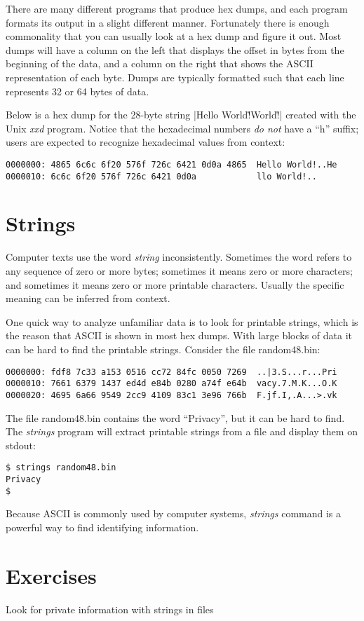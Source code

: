 There are many different programs that produce hex dumps, and each
program formats its output in a slight different manner. Fortunately
there is enough commonality that you can usually look at a hex dump
and figure it out. Most dumps will have a column on the left that
displays the offset in bytes from the beginning of the data, and a
column on the right that shows the ASCII representation of each
byte. Dumps are typically formatted such that each line represents 32
or 64 bytes of data.

Below is a hex dump for the 28-byte string 
|Hello World!\r\nHello World!\r\n| created with the Unix \emph{xxd}
program. Notice that the hexadecimal numbers \emph{do not} have a
``h'' suffix; users are expected to recognize hexadecimal values from
context:

\begin{Verbatim}
0000000: 4865 6c6c 6f20 576f 726c 6421 0d0a 4865  Hello World!..He
0000010: 6c6c 6f20 576f 726c 6421 0d0a            llo World!..
\end{Verbatim}


\section{Strings}\label{sec:strings}

Computer texts use the word \emph{string} inconsistently. Sometimes
the word refers to any sequence of zero or more bytes; sometimes it
means zero or more characters; and sometimes it means zero or
more printable characters. Usually the specific meaning can be
inferred from context. 

One quick way to analyze unfamiliar data is to look for printable
strings, which is the reason that ASCII is shown in most hex
dumps. With large blocks of data it can be hard to find the printable
strings. Consider the file random48.bin:

\begin{Verbatim}
0000000: fdf8 7c33 a153 0516 cc72 84fc 0050 7269  ..|3.S...r...Pri
0000010: 7661 6379 1437 ed4d e84b 0280 a74f e64b  vacy.7.M.K...O.K
0000020: 4695 6a66 9549 2cc9 4109 83c1 3e96 766b  F.jf.I,.A...>.vk
\end{Verbatim}

The file random48.bin contains the word ``Privacy'', but it can be hard to
find. The \emph{strings} program will extract printable
strings from a file and display them on stdout:

\begin{Verbatim}
$ strings random48.bin 
Privacy
$ 
\end{Verbatim}

Because ASCII is commonly used by computer systems, 
\emph{strings} command is a powerful way to find  identifying
information. 

\section{Exercises}
Look for private information with strings in files



